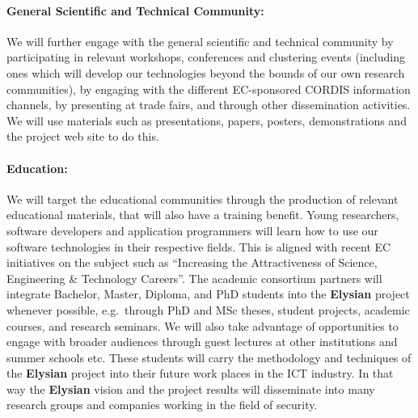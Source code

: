 \documentclass[a4paper,11pt]{article}
\newcommand{\project}[1]{\textbf{#1}\xspace}
\newcommand{\SECURITY}{\project{Elysian}}
\newcommand{\TheProject}{\SECURITY}
\begin{document}
%
%

\paragraph{General Scientific and Technical Community:}
We will further engage with the general scientific and technical community
 by participating in relevant workshops, conferences and clustering events (including ones which
 will develop our technologies beyond the bounds of our own research communities), by engaging with the
 different EC-sponsored CORDIS information channels, by presenting at trade
 fairs, and through other dissemination activities.  We will use materials such as presentations,
 papers,  posters, demonstrations and the project web site to do this.


\paragraph{Education:} We will target 
the educational communities through the production of relevant educational materials, that will
also have a training benefit. Young researchers, software
 developers and application programmers will learn how to
 use our software technologies in their
 respective fields. This is aligned with recent EC
 initiatives on the subject such as ``Increasing the Attractiveness
 of Science, Engineering \& Technology Careers''.
 The academic consortium partners will integrate Bachelor,
 Master, Diploma, and PhD students into the \TheProject{}
 project whenever possible, e.g.~through PhD and MSc theses, student
 projects, academic courses, and research seminars. 
 We will also take advantage of opportunities to engage with broader
 audiences through guest lectures at other institutions and summer schools etc.
 These students will
 carry the methodology and techniques of the \TheProject{}
 project into their future work places in the ICT industry.
 In that way the \TheProject{} vision and the project
 results will disseminate into many research groups and
 companies working in the field of security. 
\end{document}
